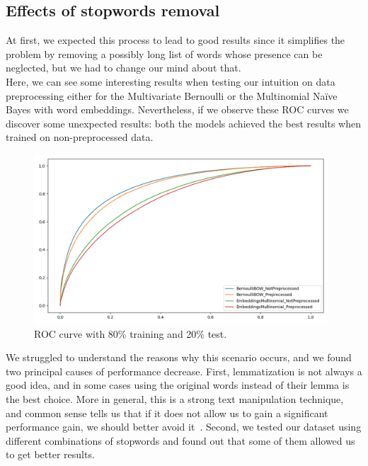 \subsection*{Effects of stopwords removal}

At first, we expected this process to lead to good results since it simplifies the problem by removing a possibly long list of words whose presence can be neglected, but we had to change our mind about that.\\

Here, we can see some interesting results when testing our intuition on data preprocessing either for the Multivariate Bernoulli or the Multinomial Naïve Bayes with word embeddings. Nevertheless, if we observe these ROC curves we discover some unexpected results: both the models achieved the best results when trained on non-preprocessed data.
\clearpage


\begin{figure}[h!t]
    \centering
    \includegraphics[width=11cm]{../experiments/plots/preprocessing.png}
    \caption{ROC curve with 80\% training and 20\% test.}
    \label{fig:PREPROCESSING_ROC}
\end{figure}



We struggled to understand the reasons why this scenario occurs, and we found two principal causes of performance decrease. First, lemmatization is not always a good idea, and in some cases using the original words instead of their lemma is the best choice. More in general, this is a strong text manipulation technique, and common sense tells us that if it does not allow us to gain a significant performance gain, we should better avoid it~\cite{data:lemmatization_tips}. Second, we tested our dataset using different combinations of stopwords and found out that some of them allowed us to get better results.\\

